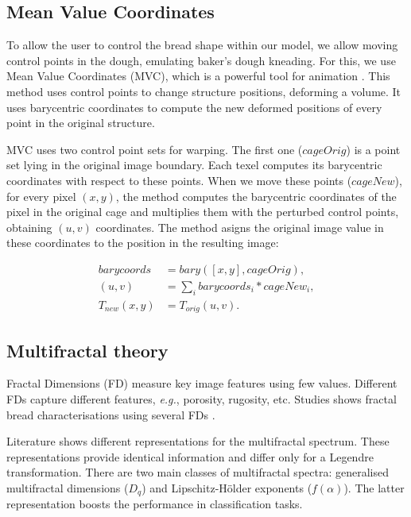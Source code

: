 \documentclass[final,5p,times]{elsarticle}
\begin{document}
{%
\subsection{Mean Value Coordinates}
To allow the user to control the bread shape within our model, we allow moving control points in the dough, emulating baker's dough kneading. For this, we use Mean Value Coordinates (MVC), which is a powerful tool for animation \cite{Floater2003,Floater2005,Ju2005}.  This method uses control points to change structure positions, deforming a volume. It uses barycentric coordinates to compute the new deformed positions of every point in the original structure.

MVC uses two control point sets for warping. The first one ($cageOrig$) is a point set lying in the original image boundary.  Each texel computes its barycentric coordinates with respect to these points. When we move these points ($cageNew$), for every pixel $(x,y)$, the method computes the barycentric coordinates of the pixel in the original cage and multiplies them with the perturbed control points, obtaining $(u,v)$ coordinates. The method asigns the original image value in these coordinates to the position in the resulting image:

\begin{align}
barycoords &= bary([x,y],cageOrig),\\
(u,v) &= \sum_{i} {barycoords_{i} * cageNew_{i}}, \\
T_{new}(x,y) &= T_{orig}(u,v).
\end{align}

\subsection{Multifractal theory}

Fractal Dimensions (FD) measure key image features using few values. Different FDs capture different features, {\em e.g.}, porosity, rugosity, etc. Studies shows fractal bread characterisations using several FDs \cite{Gonzales2008,Baravalle2012}. 

Literature shows different representations for the multifractal spectrum. These representations provide identical information and differ only for a Legendre transformation. There are two main classes of multifractal spectra: generalised multifractal dimensions ($D_{q}$) and Lipschitz-H\"older exponents ($f(\alpha)$). The latter representation boosts the performance in classification tasks.

}
\end{document}
